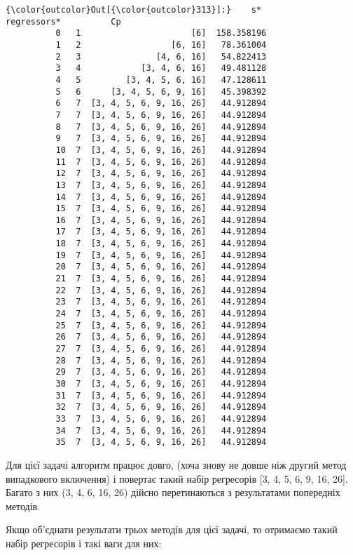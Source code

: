 \documentclass[11pt]{article}
\begin{document}
\begin{Verbatim}[commandchars=\\\{\}]
{\color{outcolor}Out[{\color{outcolor}313}]:}    s*              regressors*          Cp
          0   1                      [6]  158.358196
          1   2                  [6, 16]   78.361004
          2   3               [4, 6, 16]   54.822413
          3   4            [3, 4, 6, 16]   49.481128
          4   5         [3, 4, 5, 6, 16]   47.128611
          5   6      [3, 4, 5, 6, 9, 16]   45.398392
          6   7  [3, 4, 5, 6, 9, 16, 26]   44.912894
          7   7  [3, 4, 5, 6, 9, 16, 26]   44.912894
          8   7  [3, 4, 5, 6, 9, 16, 26]   44.912894
          9   7  [3, 4, 5, 6, 9, 16, 26]   44.912894
          10  7  [3, 4, 5, 6, 9, 16, 26]   44.912894
          11  7  [3, 4, 5, 6, 9, 16, 26]   44.912894
          12  7  [3, 4, 5, 6, 9, 16, 26]   44.912894
          13  7  [3, 4, 5, 6, 9, 16, 26]   44.912894
          14  7  [3, 4, 5, 6, 9, 16, 26]   44.912894
          15  7  [3, 4, 5, 6, 9, 16, 26]   44.912894
          16  7  [3, 4, 5, 6, 9, 16, 26]   44.912894
          17  7  [3, 4, 5, 6, 9, 16, 26]   44.912894
          18  7  [3, 4, 5, 6, 9, 16, 26]   44.912894
          19  7  [3, 4, 5, 6, 9, 16, 26]   44.912894
          20  7  [3, 4, 5, 6, 9, 16, 26]   44.912894
          21  7  [3, 4, 5, 6, 9, 16, 26]   44.912894
          22  7  [3, 4, 5, 6, 9, 16, 26]   44.912894
          23  7  [3, 4, 5, 6, 9, 16, 26]   44.912894
          24  7  [3, 4, 5, 6, 9, 16, 26]   44.912894
          25  7  [3, 4, 5, 6, 9, 16, 26]   44.912894
          26  7  [3, 4, 5, 6, 9, 16, 26]   44.912894
          27  7  [3, 4, 5, 6, 9, 16, 26]   44.912894
          28  7  [3, 4, 5, 6, 9, 16, 26]   44.912894
          29  7  [3, 4, 5, 6, 9, 16, 26]   44.912894
          30  7  [3, 4, 5, 6, 9, 16, 26]   44.912894
          31  7  [3, 4, 5, 6, 9, 16, 26]   44.912894
          32  7  [3, 4, 5, 6, 9, 16, 26]   44.912894
          33  7  [3, 4, 5, 6, 9, 16, 26]   44.912894
          34  7  [3, 4, 5, 6, 9, 16, 26]   44.912894
          35  7  [3, 4, 5, 6, 9, 16, 26]   44.912894
\end{Verbatim}
            
    Для цієї задачі алгоритм працює довго, (хоча знову не довше ніж другий
метод випадкового включення) і повертає такий набір регресорів {[}3, 4,
5, 6, 9, 16, 26{]}. Багато з них (3, 4, 6, 16, 26) дійсно перетинаються
з результатами попередніх методів.

Якщо об'єднати результати трьох методів для цієї задачі, то отримаємо
такий набір регресорів і такі ваги для них:
\end{document}
